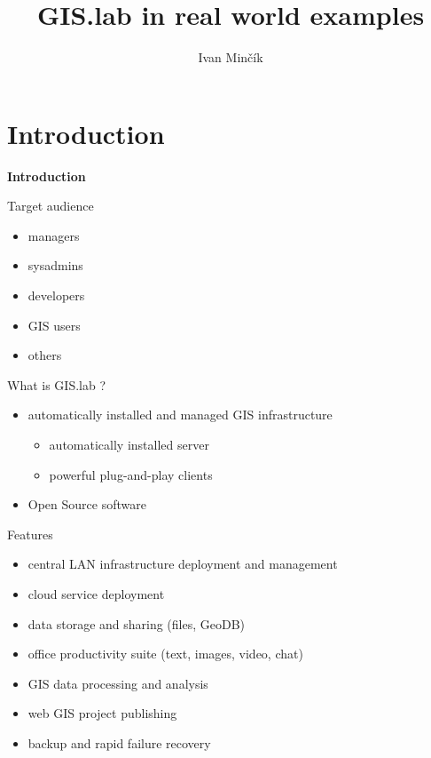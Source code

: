 \documentclass[12pt]{beamer}
\author{Ivan Minčík}
\title{GIS.lab in real world examples}
\begin{document}
\begin{frame}
	\titlepage
\end{frame}


\section{Introduction}
\begin{frame}
	\begin{center}
		\LARGE\textbf{Introduction}	
	\end{center}
\end{frame}


\begin{frame}{Target audience}
	\begin{itemize}
		\item managers
		\item sysadmins
		\item developers
		\item GIS users
		\item others
	\end{itemize}
\end{frame}


\begin{frame}{What is GIS.lab ?}
	\begin{itemize}[<+->]
		\item automatically installed and managed GIS infrastructure
			\begin{itemize}[<+->]
				\item automatically installed server
				\item powerful plug-and-play clients
			\end{itemize}
		\item Open Source software
	\end{itemize}
\end{frame}


\begin{frame}{Features}
	\begin{itemize}[<+->]
		\item central LAN infrastructure deployment and management
		\item cloud service deployment
		\item data storage and sharing (files, GeoDB)
		\item office productivity suite (text, images, video, chat)
		\item GIS data processing and analysis
		\item web GIS project publishing
		\item backup and rapid failure recovery
	\end{itemize}
\end{frame}
\end{document}
